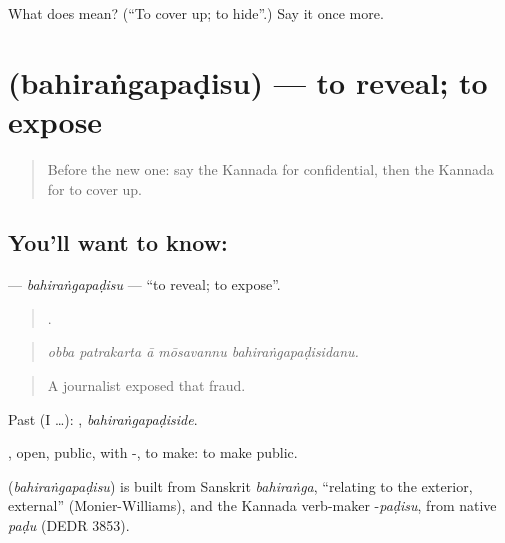 \begin{tcolorbox}[breakable,colback=teal!4,colframe=teal!35!black,title={Before you move on}]
What does  mean? (\textquotedblleft{}To cover up; to hide\textquotedblright{}.) Say it once more.
\end{tcolorbox}
\section[\texorpdfstring{\kn{ಬಹಿರಂಗಪಡಿಸು} (bahiraṅgapaḍisu)}{ಬಹಿರಂಗಪಡಿಸು (bahiraṅgapaḍisu)}]{ (bahiraṅgapaḍisu) — to reveal; to expose}

\label{lesson:KA-C357-bahirangapadisu}



\begin{quote}
Before the new one: say the Kannada for confidential, then the Kannada for to cover up.
\end{quote}

\subsection*{You'll want to know: }
\textbf{} — \emph{bahiraṅgapaḍisu} — \textquotedblleft{}to reveal; to expose\textquotedblright{}.

\begin{quote}
    .
\end{quote}

\begin{quote}
\emph{obba patrakarta ā mōsavannu bahiraṅgapaḍisidanu.}
\end{quote}

\begin{quote}
A journalist exposed that fraud.
\end{quote}

Past (I …): , \emph{bahiraṅgapaḍiside}.

, open, public, with -, to make: to make public.

\begin{cousinweb}
\textbf{} (\emph{bahiraṅgapaḍisu}) is built from Sanskrit \emph{bahiraṅga}, \textquotedblleft{}relating to the exterior, external\textquotedblright{} (Monier-Williams), and the Kannada verb-maker -\emph{paḍisu}, from native \emph{paḍu} (DEDR 3853).
\end{cousinweb}

